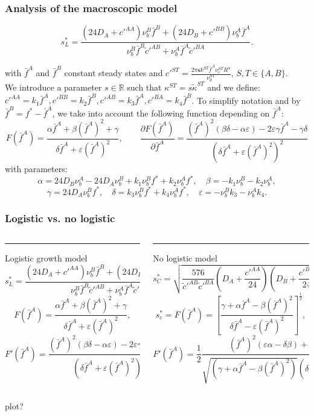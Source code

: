 \documentclass[10pt]{beamer}
\newcommand\eps{\varepsilon}
\newcommand\ka{\kappa}
\def \p {{\partial}}
\def \a {{\alpha}}
\def \b {{\beta}}
\def \g {{\gamma}}
\def \d {{\delta}}
\def \bfA {{\bar{f}^A}}
\def \bfB {{\bar{f}^B}}
\newcommand\Fontv{\fontsize{7}{7.2}\selectfont}
\newcommand\Fontvii{\fontsize{9}{7.2}\selectfont}
\begin{document}
\begin{frame}
\frametitle{Analysis of the macroscopic model}
\Fontvii
$$s_{L}^{*}=\frac{(24 D_A+c'^{AA})\nu_{b}^{B}\bar{f}^{B}+(24 D_B+c'^{BB})\nu_{b}^{A}\bar{f}^A}{\nu_{b}^{B}\bar{f}^B\tilde{c}'^{AB}+\nu_{b}^{A}\bar{f}^A\tilde{c}'^{BA}}. $$

with $\bar{f}^A$ and $\bar{f}^B$ constant steady states and 
$c'^{ST}=\frac{2\pi \textbf{s} k^{ST} \bfA \nu_c^{ST} R^{4}}{\nu_d^{ST}}$, $S,T \in \{ A,B \}$. \\
We introduce a parameter $s\in \mathbb{R}$ such that $\ka^{ST}=s\tilde{\ka}^{ST} $
and we define: $c'^{AA}=k_1 \bfA, c'^{BB}=k_2\bfB, c'^{AB}=k_3\bfA, c'^{BA}=k_4\bfB$.
To simplify notation and by $\bar{f}^B=f^*-\bar{f}^A$, we take into account the following function depending on $\bfA$:
$$F(\bfA)=\frac{\a \bfA + \b (\bfA)^2 + \g}{\d \bfA + \eps(\bfA)^2}, \quad\quad 
\frac{\p F(\bfA)}{\p \bfA}=\frac{(\bfA)^2(\b \d-\a \eps)-2\eps \g \bfA - \g\d}{(\d \bfA+\eps (\bfA)^2)^2}$$ 
with parameters:
$$
\a= 24D_B \nu_b^A -24 D_A \nu_b^B +k_1 \nu_b^B f^* + k_2 \nu_b^A f^*, \quad
\b=-k_1 \nu_b^B -k_2 \nu_b^A, $$
$$ \g= 24 D_A \nu_b^B f^*, \quad 
\d= k_3\nu_b^B f^*+k_4 \nu_b^A f^*, \quad
\eps= -\nu_b^B k_3-	\nu_b^A k_4.
$$
\end{frame}




\begin{frame}
\frametitle{Logistic vs. no logistic}
\Fontv
\begin{columns}[T] %
	\begin{column}{.50\textwidth}
		\color{blue}\rule{\linewidth}{2pt}
		Logistic growth model
		$$s_{L}^{*}=\frac{(24 D_A+c'^{AA})\nu_{b}^{B}\bar{f}^{B}+(24 D_B+c'^{BB})\nu_{b}^{A}\bar{f}^A}{\nu_{b}^{B}\bar{f}^B\tilde{c}'^{AB}+\nu_{b}^{A}\bar{f}^A\tilde{c}'^{BA}}, $$
		$$F(\bfA)=\frac{\a \bfA + \b (\bfA)^2 + \g}{\d \bfA + \eps(\bfA)^2}, $$
		$$F'(\bfA)=\frac{(\bfA)^2(\b \d-\a \eps)-2\eps \g \bfA - \g\d}{(\d \bfA+\eps (\bfA)^2)^2}$$ 
		
		
	\end{column}%
	\hfill%
	\begin{column}{.50\textwidth}
		\color{blue}\rule{\linewidth}{2pt}
		No logistic model
		$$ s^{*}_{C}= \sqrt{\frac{576}{\tilde{c}'^{AB} \tilde{c}'^{BA}} \left( D_A+\frac{c'^{AA}}{24} \right) \left(D_B+\frac{c'^{BB}}{24} \right) } $$
		$$ s^{*}_c=F(\bfA)=\left[\frac{\g +\a \bfA - \b (\bfA)^2}{\d \bfA-\eps(\bfA)^2} \right]^{\frac{1}{2}},  $$
		$$  F'(\bfA)=\frac{1}{2} \frac{(\bfA)^{2}(\eps \a-\d\b)+2\eps\g\bfA-\d\g}{\sqrt{(\g+\a \bfA-\b(\bfA)^2)} (\d\bfA-\eps(\bfA)^2)^{3/2} }$$
		
	\end{column}%
\end{columns}

plot?
\end{frame}
\end{document}
